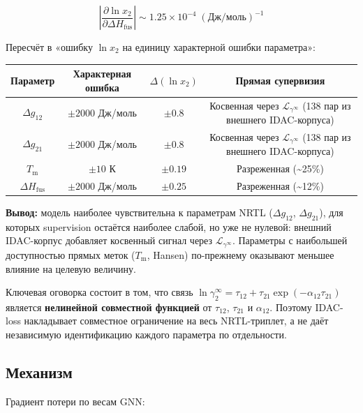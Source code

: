 \documentclass[11pt]{article}
\begin{document}
\begin{equation*}
\left|\frac{\partial \ln x_2}{\partial \Delta H_{\mathrm{fus}}}\right| \sim 1.25 \times 10^{-4} \;(\text{Дж/моль})^{-1}
\end{equation*}

Пересчёт в «ошибку $\ln x_2$ на единицу характерной ошибки параметра»:

\begin{center}
\begin{tabular}{|c|c|c|c|}
\hline
Параметр & Характерная ошибка & $\Delta(\ln x_2)$ & Прямая супервизия \\
\hline
$\Delta g_{12}$ & $\pm 2000$ Дж/моль & $\pm 0.8$ & \shortstack[l]{Косвенная через $\mathcal{L}_{\gamma^\infty}$\\(138 пар из внешнего IDAC-корпуса)} \\
\hline
$\Delta g_{21}$ & $\pm 2000$ Дж/моль & $\pm 0.8$ & \shortstack[l]{Косвенная через $\mathcal{L}_{\gamma^\infty}$\\(138 пар из внешнего IDAC-корпуса)} \\
\hline
$T_{\mathrm{m}}$ & $\pm 10$ К & $\pm 0.19$ & Разреженная (\textasciitilde25\%) \\
\hline
$\Delta H_{\mathrm{fus}}$ & $\pm 2000$ Дж/моль & $\pm 0.25$ & Разреженная (\textasciitilde12\%) \\
\hline
\end{tabular}
\end{center}

\textbf{Вывод:} модель наиболее чувствительна к параметрам NRTL ($\Delta g_{12}$, $\Delta g_{21}$), для которых supervision остаётся наиболее слабой, но уже не нулевой: внешний IDAC-корпус добавляет косвенный сигнал через $\mathcal{L}_{\gamma^\infty}$. Параметры с наибольшей доступностью прямых меток ($T_{\mathrm{m}}$, Hansen) по-прежнему оказывают меньшее влияние на целевую величину.

Ключевая оговорка состоит в том, что связь $\ln\gamma_2^\infty = \tau_{12} + \tau_{21}\exp(-\alpha_{12}\tau_{21})$ является \textbf{нелинейной совместной функцией} от $\tau_{12}$, $\tau_{21}$ и $\alpha_{12}$. Поэтому IDAC-loss накладывает совместное ограничение на весь NRTL-триплет, а не даёт независимую идентификацию каждого параметра по отдельности.

\subsection{Механизм}

Градиент потери по весам GNN:
\end{document}
